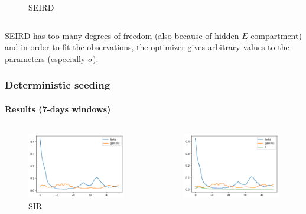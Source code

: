 \documentclass[aspectratio=43]{beamer}
\begin{document}
\begin{frame}
\begin{columns}
\begin{figure}
			\caption{SEIRD}
		\end{figure}
	\end{columns}

SEIRD has too many degrees of freedom (also because of hidden $E$ compartment) and in order to fit the observations, the optimizer gives arbitrary values to the parameters (especially $\sigma$).
\end{frame}

\begin{frame}
	\frametitle{Deterministic seeding}
	\framesubtitle{Results (7-days windows)}
	\begin{columns}
				\begin{figure}
					\includegraphics[width=\textwidth]{img/sir_det_7.png}
					\caption{SIR}
				\end{figure}
				\begin{figure}
					\includegraphics[width=\textwidth]{img/sird_det_7.png}

\end{figure}
\end{columns}
\end{frame}
\end{document}
